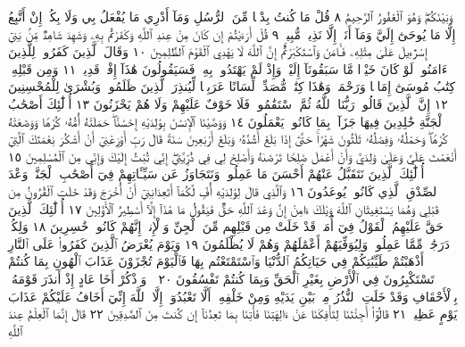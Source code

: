 وَبَيْنَكُمْۖ وَهُوَ ٱلْغَفُورُ ٱلرَّحِيمُ ٨ قُلْ مَا كُنتُ بِدْعࣰا مِّنَ ٱلرُّسُلِ
وَمَآ أَدْرِي مَا يُفْعَلُ بِي وَلَا بِكُمْۖ إِنْ أَتَّبِعُ إِلَّا مَا يُوحَىٰٓ إِلَيَّ وَمَآ أَنَا۠
إِلَّا نَذِيرࣱ مُّبِينࣱ ٩ قُلْ أَرَءَيْتُمْ إِن كَانَ مِنْ عِندِ ٱللَّهِ وَكَفَرْتُم بِهِۦ
وَشَهِدَ شَاهِدࣱ مِّنۢ بَنِيٓ إِسْرَٰٓءِيلَ عَلَىٰ مِثْلِهِۦ فَـَٔامَنَ وَٱسْتَكْبَرْتُمْۚ
إِنَّ ٱللَّهَ لَا يَهْدِي ٱلْقَوْمَ ٱلظَّٰلِمِينَ ١٠ وَقَالَ ٱلَّذِينَ كَفَرُوا۟
لِلَّذِينَ ءَامَنُوا۟ لَوْ كَانَ خَيْرࣰا مَّا سَبَقُونَآ إِلَيْهِۚ وَإِذْ لَمْ يَهْتَدُوا۟ بِهِۦ
فَسَيَقُولُونَ هَٰذَآ إِفْكࣱ قَدِيمࣱ ١١ وَمِن قَبْلِهِۦ كِتَٰبُ مُوسَىٰٓ
إِمَامࣰا وَرَحْمَةࣰۚ وَهَٰذَا كِتَٰبࣱ مُّصَدِّقࣱ لِّسَانًا عَرَبِيࣰّا لِّيُنذِرَ
ٱلَّذِينَ ظَلَمُوا۟ وَبُشْرَىٰ لِلْمُحْسِنِينَ ١٢ إِنَّ ٱلَّذِينَ قَالُوا۟ رَبُّنَا
ٱللَّهُ ثُمَّ ٱسْتَقَٰمُوا۟ فَلَا خَوْفٌ عَلَيْهِمْ وَلَا هُمْ يَحْزَنُونَ ١٣
أُو۟لَٰٓئِكَ أَصْحَٰبُ ٱلْجَنَّةِ خَٰلِدِينَ فِيهَا جَزَآءَۢ بِمَا كَانُوا۟ يَعْمَلُونَ ١٤
وَوَصَّيْنَا ٱلْإِنسَٰنَ بِوَٰلِدَيْهِ إِحْسَٰنًاۖ حَمَلَتْهُ أُمُّهُۥ كُرْهࣰا وَوَضَعَتْهُ
كُرْهࣰاۖ وَحَمْلُهُۥ وَفِصَٰلُهُۥ ثَلَٰثُونَ شَهْرًاۚ حَتَّىٰٓ إِذَا بَلَغَ أَشُدَّهُۥ وَبَلَغَ
أَرْبَعِينَ سَنَةࣰ قَالَ رَبِّ أَوْزِعْنِيٓ أَنْ أَشْكُرَ نِعْمَتَكَ ٱلَّتِيٓ أَنْعَمْتَ
عَلَيَّ وَعَلَىٰ وَٰلِدَيَّ وَأَنْ أَعْمَلَ صَٰلِحࣰا تَرْضَىٰهُ وَأَصْلِحْ لِي فِي ذُرِّيَّتِيٓۖ
إِنِّي تُبْتُ إِلَيْكَ وَإِنِّي مِنَ ٱلْمُسْلِمِينَ ١٥ أُو۟لَٰٓئِكَ ٱلَّذِينَ نَتَقَبَّلُ
عَنْهُمْ أَحْسَنَ مَا عَمِلُوا۟ وَنَتَجَاوَزُ عَن سَيِّـَٔاتِهِمْ فِيٓ أَصْحَٰبِ
ٱلْجَنَّةِۖ وَعْدَ ٱلصِّدْقِ ٱلَّذِي كَانُوا۟ يُوعَدُونَ ١٦ وَٱلَّذِي قَالَ
لِوَٰلِدَيْهِ أُفࣲّ لَّكُمَآ أَتَعِدَانِنِيٓ أَنْ أُخْرَجَ وَقَدْ خَلَتِ ٱلْقُرُونُ مِن
قَبْلِي وَهُمَا يَسْتَغِيثَانِ ٱللَّهَ وَيْلَكَ ءَامِنْ إِنَّ وَعْدَ ٱللَّهِ حَقࣱّ فَيَقُولُ
مَا هَٰذَآ إِلَّآ أَسَٰطِيرُ ٱلْأَوَّلِينَ ١٧ أُو۟لَٰٓئِكَ ٱلَّذِينَ حَقَّ عَلَيْهِمُ ٱلْقَوْلُ
فِيٓ أُمَمࣲ قَدْ خَلَتْ مِن قَبْلِهِم مِّنَ ٱلْجِنِّ وَٱلْإِنسِۖ إِنَّهُمْ كَانُوا۟
خَٰسِرِينَ ١٨ وَلِكُلࣲّ دَرَجَٰتࣱ مِّمَّا عَمِلُوا۟ۖ وَلِيُوَفِّيَهُمْ أَعْمَٰلَهُمْ وَهُمْ لَا
يُظْلَمُونَ ١٩ وَيَوْمَ يُعْرَضُ ٱلَّذِينَ كَفَرُوا۟ عَلَى ٱلنَّارِ أَذْهَبْتُمْ طَيِّبَٰتِكُمْ فِي
حَيَاتِكُمُ ٱلدُّنْيَا وَٱسْتَمْتَعْتُم بِهَا فَٱلْيَوْمَ تُجْزَوْنَ عَذَابَ ٱلْهُونِ بِمَا
كُنتُمْ تَسْتَكْبِرُونَ فِي ٱلْأَرْضِ بِغَيْرِ ٱلْحَقِّ وَبِمَا كُنتُمْ تَفْسُقُونَ ٢٠
۞ وَٱذْكُرْ أَخَا عَادٍ إِذْ أَنذَرَ قَوْمَهُۥ بِٱلْأَحْقَافِ وَقَدْ خَلَتِ ٱلنُّذُرُ
مِنۢ بَيْنِ يَدَيْهِ وَمِنْ خَلْفِهِۦٓ أَلَّا تَعْبُدُوٓا۟ إِلَّا ٱللَّهَ إِنِّيٓ أَخَافُ عَلَيْكُمْ
عَذَابَ يَوْمٍ عَظِيمࣲ ٢١ قَالُوٓا۟ أَجِئْتَنَا لِتَأْفِكَنَا عَنْ ءَالِهَتِنَا فَأْتِنَا
بِمَا تَعِدُنَآ إِن كُنتَ مِنَ ٱلصَّٰدِقِينَ ٢٢ قَالَ إِنَّمَا ٱلْعِلْمُ عِندَ ٱللَّهِ
